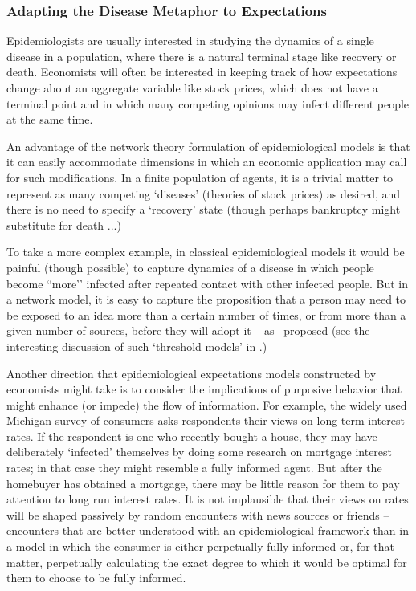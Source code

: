 \subsubsection{Adapting the Disease Metaphor to Expectations}\label{subsubsec:AdaptingTheModel}
\hypertarget{AdaptingTheModel}{}

Epidemiologists are usually interested in studying the dynamics of a single disease in a population, where there is a natural terminal stage like recovery or death.  Economists will often be interested in keeping track of how expectations change about an aggregate variable like stock prices, which does not have a terminal point and in which many competing opinions may infect different people at the same time.

An advantage of the network theory formulation of epidemiological models is that it can easily accommodate dimensions in which an economic application may call for such modifications.  In a finite population of agents, it is a trivial matter to represent as many competing `diseases' (theories of stock prices) as desired, and there is no need to specify a `recovery' state (though perhaps bankruptcy might substitute for death ...)

To take a more complex example, in classical epidemiological models it would be painful (though possible) to capture dynamics of a disease in which people become  ``more’’ infected after repeated contact with other infected people.  But in a network model, it is easy to capture the proposition that
a person may need to be exposed to an idea more than a certain number of times, or from more than a given number of sources, before they will adopt it -- as~\cite{jackson2007diffusion} proposed (see the interesting discussion of such `threshold models' in \cite{glasserman2016contagion}.)

Another direction that epidemiological expectations models constructed by economists might take is to consider the implications of purposive behavior that might enhance (or impede) the flow of information.  For example, the widely used Michigan survey of consumers asks respondents their views on long term interest rates. If the respondent is one who recently bought a house, they may have deliberately `infected' themselves by doing some research on mortgage interest rates; in that case they might resemble a fully informed  agent.  But after the homebuyer has obtained a mortgage, there may be little  reason  for them to pay attention to long run interest rates.  It is not implausible that their views on rates will be shaped passively by random encounters with news sources or friends -- encounters that are better understood with an epidemiological framework than in a model in which the consumer is either perpetually fully informed or, for that matter, perpetually calculating the exact degree to which it would be optimal for them to choose to be fully informed.

